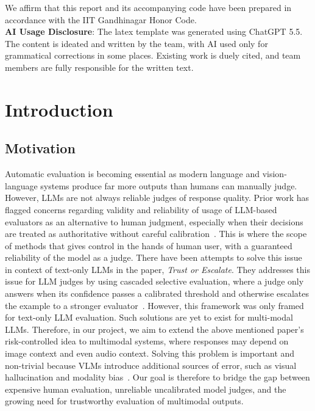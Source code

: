 \documentclass[11pt,a4paper]{article}
\begin{document}
\begin{titlepage}
\begin{table}[H]
\begin{tabularx}{0.9\textwidth}{|X|X|X|}
    \end{tabularx}
    \end{table}
    
    \vfill
    
    {\small
    We affirm that this report and its accompanying code have been prepared in
    accordance with the IIT Gandhinagar Honor Code. \\
    \textbf{AI Usage Disclosure}: The latex template was generated using ChatGPT 5.5. The content is ideated and written by the team, with AI used only for grammatical corrections in some places. Existing work is duely cited, and team members are fully responsible for the written text.
    \par}
\end{titlepage}

\tableofcontents
\newpage


\section{Introduction}

\subsection{Motivation}

Automatic evaluation is becoming essential as modern language and vision-language systems produce far more outputs than humans can manually judge. However, LLMs are not always reliable judges of response quality. Prior work has flagged concerns regarding validity and reliability of usage of LLM-based evaluators as an alternative to human judgment, especially when their decisions are treated as authoritative without careful calibration~\cite{chehbouni2025neither}. This is where the scope of methods that gives control in the hands of human user, with a guaranteed reliability of the model as a judge.
There have been attempts to solve this issue in context of text-only LLMs in the paper, \textit{Trust or Escalate}. They addresses this issue for LLM judges by using cascaded selective evaluation, where a judge only answers when its confidence passes a calibrated threshold and otherwise escalates the example to a stronger evaluator~\cite{jung2025trust}. However, this framework was only framed for text-only LLM evaluation. Such solutions are yet to exist for multi-modal LLMs. Therefore, in our project, we aim to extend the above mentioned paper's risk-controlled idea to multimodal systems, where responses may depend on image context and even audio context. Solving this problem is important and non-trivial because VLMs introduce additional sources of error, such as visual hallucination and modality bias~\cite{zheng2025modality}. Our goal is therefore to bridge the gap between expensive human evaluation, unreliable uncalibrated model judges, and the growing need for trustworthy evaluation of multimodal outputs. 
\end{document}
